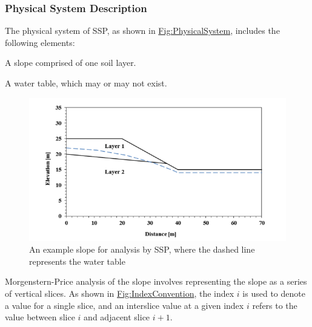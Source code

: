 \documentclass[12pt]{article}
\begin{document}
\subsubsection{Physical System Description}
\label{Sec:PhysSyst}
The physical system of SSP, as shown in \hyperref[Figure:PhysicalSystem]{Fig:PhysicalSystem}, includes the following elements:

\begin{description}[font=\normalfont]
\item[PS1:]{A slope comprised of one soil layer.}
\item[PS2:]{A water table, which may or may not exist.}
\end{description}
\begin{figure}[H]
\begin{center}
\includegraphics[width=\textwidth]{../../../../datafiles/ssp/PhysSyst.png}
\caption{An example slope for analysis by SSP, where the dashed line represents the water table}
\label{Figure:PhysicalSystem}
\end{center}
\end{figure}
Morgenstern-Price analysis \cite{morgenstern1965} of the slope involves representing the slope as a series of vertical slices. As shown in \hyperref[Figure:IndexConvention]{Fig:IndexConvention}, the index $i$ is used to denote a value for a single slice, and an interslice value at a given index $i$ refers to the value between slice $i$ and adjacent slice $i+1$.
\end{document}
